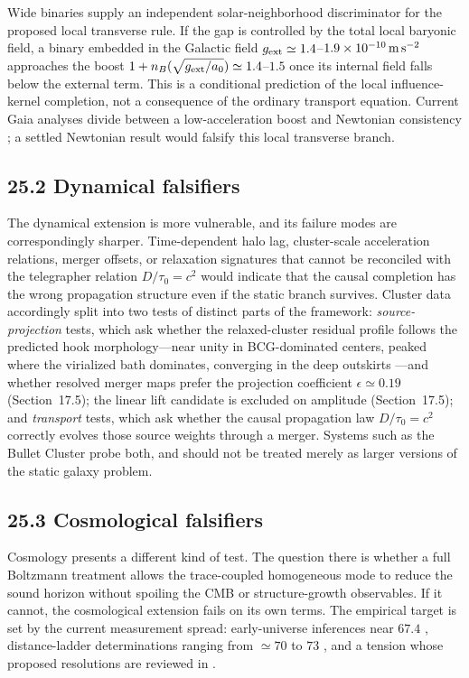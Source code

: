 \documentclass[11pt]{article}
\begin{document}
Wide binaries supply an independent solar-neighborhood discriminator for the proposed local transverse rule. If the gap is controlled by the total local baryonic field, a binary embedded in the Galactic field $g_{\rm ext}\simeq1.4$--$1.9\times10^{-10}\,{\rm m\,s^{-2}}$ approaches the boost $1+n_B(\sqrt{g_{\rm ext}/a_0})\simeq1.4$--$1.5$ once its internal field falls below the external term. This is a conditional prediction of the local influence-kernel completion, not a consequence of the ordinary transport equation. Current Gaia analyses divide between a low-acceleration boost and Newtonian consistency \citep{Chae2023,Banik2024}; a settled Newtonian result would falsify this local transverse branch.

\subsection{25.2 Dynamical falsifiers}

The dynamical extension is more vulnerable, and its failure modes are correspondingly sharper. Time-dependent halo lag, cluster-scale acceleration relations, merger offsets, or relaxation signatures that cannot be reconciled with the telegrapher relation $D/\tau_0=c^2$ would indicate that the causal completion has the wrong propagation structure even if the static branch survives. Cluster data accordingly split into two tests of distinct parts of the framework: \emph{source-projection} tests, which ask whether the relaxed-cluster residual profile follows the predicted hook morphology---near unity in BCG-dominated centers, peaked where the virialized bath dominates, converging in the deep outskirts \citep{Tian2020,Eckert2022,Li2023}---and whether resolved merger maps prefer the projection coefficient $\epsilon\simeq0.19$ (Section~17.5); the linear lift candidate is excluded on amplitude (Section~17.5); and \emph{transport} tests, which ask whether the causal propagation law $D/\tau_0=c^2$ correctly evolves those source weights through a merger. Systems such as the Bullet Cluster \citep{Clowe2006} probe both, and should not be treated merely as larger versions of the static galaxy problem.

\subsection{25.3 Cosmological falsifiers}

Cosmology presents a different kind of test. The question there is whether a full Boltzmann treatment allows the trace-coupled homogeneous mode to reduce the sound horizon without spoiling the CMB or structure-growth observables. If it cannot, the cosmological extension fails on its own terms. The empirical target is set by the current measurement spread: early-universe inferences near $67.4$ \citep{Planck2020}, distance-ladder determinations ranging from $\simeq70$ \citep{Freedman2025} to $73$ \citep{Riess2022}, and a tension whose proposed resolutions are reviewed in \citet{DiValentino2021}.
\end{document}

